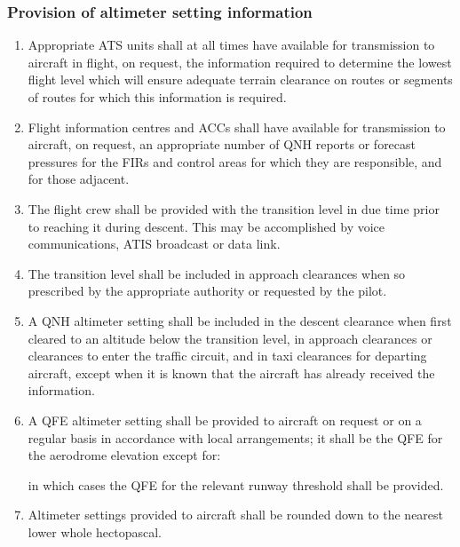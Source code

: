\subsubsection{Provision of altimeter setting information}

\begin{enumerate}
    \item Appropriate ATS units shall at all times have available for transmission to aircraft in flight, on request, the information required to determine the lowest flight level which will ensure adequate terrain clearance on routes or segments of routes for which this information is required.
    \item Flight information centres and ACCs shall have available for transmission to aircraft, on request, an appropriate number of QNH reports or forecast pressures for the FIRs and control areas for which they are responsible, and for those adjacent.
    \item The flight crew shall be provided with the transition level in due time prior to reaching it during descent. This may be accomplished by voice communications, ATIS broadcast or data link.
    \item The transition level shall be included in approach clearances when so prescribed by the appropriate authority or requested by the pilot.
    \item A QNH altimeter setting shall be included in the descent clearance when first cleared to an altitude below the transition level, in approach clearances or clearances to enter the traffic circuit, and in taxi clearances for departing aircraft, except when it is known that the aircraft has already received the information.
    \item A QFE altimeter setting shall be provided to aircraft on request or on a regular basis in accordance with local arrangements; it shall be the QFE for the aerodrome elevation except for:


    \noindent in which cases the QFE for the relevant runway threshold shall be provided.

    \item Altimeter settings provided to aircraft shall be rounded down to the nearest lower whole hectopascal.
\end{enumerate}

